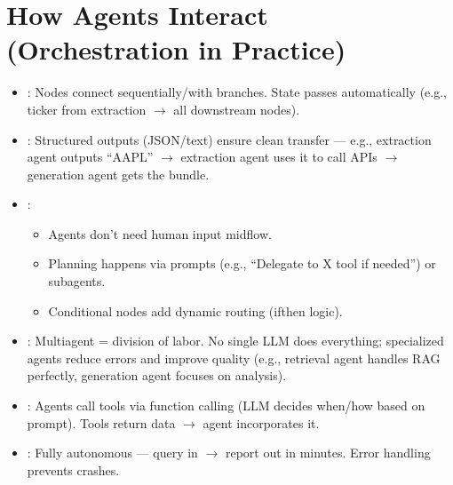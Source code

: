 \documentclass[letterpaper,10pt,english]{sphinxmanual}
\begin{document}
\section{How Agents Interact (Orchestration in Practice)}
\label{\detokenize{agentic-example:how-agents-interact-orchestration-in-practice}}\begin{itemize}
\item {} 
\sphinxAtStartPar
{}: Nodes connect sequentially/with branches. State
passes automatically (e.g., ticker from extraction \(\rightarrow\) all downstream
nodes).

\item {} 
\sphinxAtStartPar
{}: Structured outputs (JSON/text) ensure clean transfer —
e.g., extraction agent outputs “AAPL” \(\rightarrow\) extraction agent uses it to
call APIs \(\rightarrow\) generation agent gets the bundle.

\item {} 
\sphinxAtStartPar
{}:
\begin{itemize}
\item {} 
\sphinxAtStartPar
Agents don’t need human input mid\sphinxhyphen{}flow.

\item {} 
\sphinxAtStartPar
Planning happens via prompts (e.g., “Delegate to X tool if
needed”) or sub\sphinxhyphen{}agents.

\item {} 
\sphinxAtStartPar
Conditional nodes add dynamic routing (if\sphinxhyphen{}then logic).

\end{itemize}

\item {} 
\sphinxAtStartPar
{}: Multi\sphinxhyphen{}agent = division of labor. No single LLM
does everything; specialized agents reduce errors and improve quality
(e.g., retrieval agent handles RAG perfectly, generation agent
focuses on analysis).

\item {} 
\sphinxAtStartPar
{}: Agents call tools via function calling (LLM
decides when/how based on prompt). Tools return data \(\rightarrow\) agent
incorporates it.

\item {} 
\sphinxAtStartPar
{}: Fully autonomous — query in \(\rightarrow\) report out in
minutes. Error handling prevents crashes.

\end{itemize}
\end{document}
